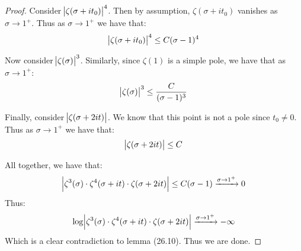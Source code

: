 \begin{proof}
Consider $\abs{\zeta(\sigma+i t_0) }^4$. Then by assumption, $\zeta(\sigma+i t_0)$ vanishes as $\sigma \to 1^+$. Thus as $\sigma \to 1^+$ we have that:
\begin{align*}
    \abs{\zeta(\sigma+i t_0) }^4 \leq C (\sigma - 1)^4
\end{align*}

Now consider $\abs{\zeta(\sigma)}^3$. Similarly, since $\zeta(1)$ is a simple pole, we have that as $\sigma \to 1^+$:
\begin{align*}
    \abs{\zeta(\sigma)}^3 \leq \frac{C}{(\sigma - 1)^3}
\end{align*}

Finally, consider $\abs{\zeta(\sigma + 2 it) }$. We know that this point is not a pole since $t_0 \neq 0$. Thus as $\sigma \to 1^+$ we have that:
\begin{align*}
    \abs{\zeta(\sigma + 2 it) } \leq C
\end{align*}

All together, we have that:
\begin{align*}
    \abs{ \zeta^3 (\sigma) \cdot \zeta^4 (\sigma+it) \cdot \zeta(\sigma + 2 it) } \leq C (\sigma - 1) \xrightarrow[]{ \sigma \to 1^+} 0
\end{align*}
Thus:
\begin{align*}
    \log \abs{ \zeta^3 (\sigma) \cdot \zeta^4 (\sigma+it) \cdot \zeta(\sigma + 2 it) }  \xrightarrow[]{ \sigma \to 1^+} - \infty
\end{align*}
Which is a clear contradiction to lemma (26.10). Thus we are done.
\end{proof}
































